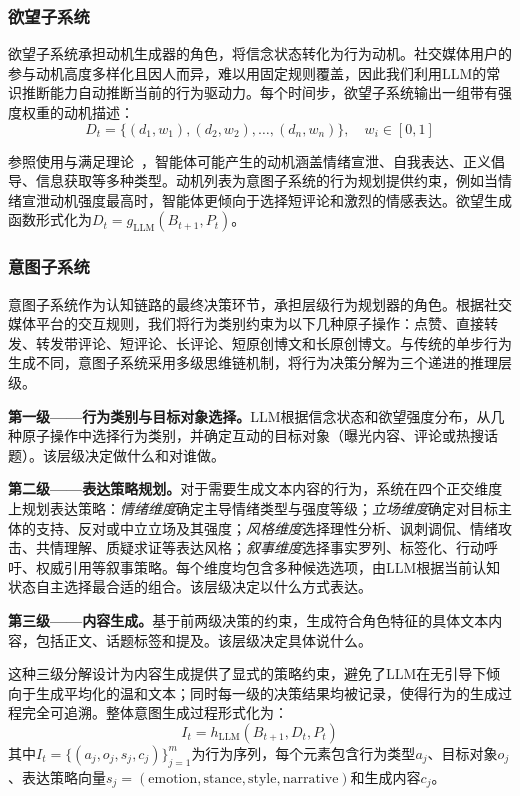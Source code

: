 \documentclass[a4paper,fleqn]{cas-sc}
\begin{document}
\subsubsection{欲望子系统}

欲望子系统承担动机生成器的角色，将信念状态转化为行为动机。社交媒体用户的参与动机高度多样化且因人而异，难以用固定规则覆盖，因此我们利用LLM的常识推断能力自动推断当前的行为驱动力。每个时间步，欲望子系统输出一组带有强度权重的动机描述：
\begin{equation}
D_t = \{(d_1, w_1), (d_2, w_2), \ldots, (d_n, w_n)\}, \quad w_i \in [0, 1]
\end{equation}

参照使用与满足理论~\citep{katz_uses_1973}，智能体可能产生的动机涵盖情绪宣泄、自我表达、正义倡导、信息获取等多种类型。动机列表为意图子系统的行为规划提供约束，例如当情绪宣泄动机强度最高时，智能体更倾向于选择短评论和激烈的情感表达。欲望生成函数形式化为$D_t = g_{\text{LLM}}(B_{t+1}, P_t)$。

\subsubsection{意图子系统}

意图子系统作为认知链路的最终决策环节，承担层级行为规划器的角色。根据社交媒体平台的交互规则，我们将行为类别约束为以下几种原子操作：点赞、直接转发、转发带评论、短评论、长评论、短原创博文和长原创博文。与传统的单步行为生成不同，意图子系统采用多级思维链机制，将行为决策分解为三个递进的推理层级。

\textbf{第一级——行为类别与目标对象选择。}LLM根据信念状态和欲望强度分布，从几种原子操作中选择行为类别，并确定互动的目标对象（曝光内容、评论或热搜话题）。该层级决定做什么和对谁做。

\textbf{第二级——表达策略规划。}对于需要生成文本内容的行为，系统在四个正交维度上规划表达策略：\textit{情绪维度}确定主导情绪类型与强度等级；\textit{立场维度}确定对目标主体的支持、反对或中立立场及其强度；\textit{风格维度}选择理性分析、讽刺调侃、情绪攻击、共情理解、质疑求证等表达风格；\textit{叙事维度}选择事实罗列、标签化、行动呼吁、权威引用等叙事策略。每个维度均包含多种候选选项，由LLM根据当前认知状态自主选择最合适的组合。该层级决定以什么方式表达。

\textbf{第三级——内容生成。}基于前两级决策的约束，生成符合角色特征的具体文本内容，包括正文、话题标签和提及。该层级决定具体说什么。

这种三级分解设计为内容生成提供了显式的策略约束，避免了LLM在无引导下倾向于生成平均化的温和文本；同时每一级的决策结果均被记录，使得行为的生成过程完全可追溯。整体意图生成过程形式化为：
\begin{equation}
I_t = h_{\text{LLM}}(B_{t+1}, D_t, P_t)
\end{equation}
其中$I_t = \{(a_j, o_j, s_j, c_j)\}_{j=1}^{m}$为行为序列，每个元素包含行为类型$a_j$、目标对象$o_j$、表达策略向量$s_j = (\text{emotion}, \text{stance}, \text{style}, \text{narrative})$和生成内容$c_j$。
\end{document}
